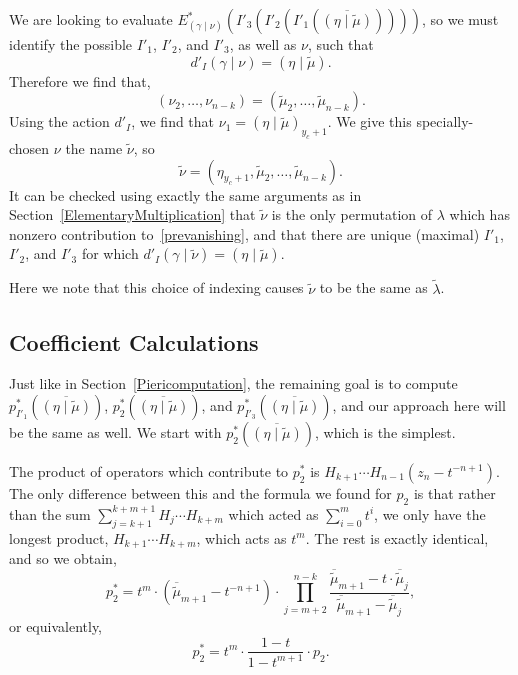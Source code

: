 \documentclass[ALCO]{cedram}
\newcommand{\Estar}[1]{E^*_{#1}}
\newcommand{\gammanu}{{(\gamma \mid \nu)}}
\newcommand{\mutilde}{{\widetilde{\mu}}}
\newcommand{\lambdatilde}{{\widetilde{\lambda}}}
\newcommand{\etamutilde}{{(\eta \mid \widetilde{\mu})}}
\newcommand{\dtwo}{d'_I}
\newcommand{\nutilde}{\widetilde{\nu}}
\newcommand{\gammanutilde}{{(\gamma \mid \nutilde)}}
\newcommand{\pstarone}{p^*_{I'_1}}
\newcommand{\pstartwo}{p^*_2}
\newcommand{\pstarthree}{p^*_{I'_3}}
\begin{document}
We are looking to evaluate $\Estar{\gammanu}\left(I'_3\left(I'_2\left(I'_1\left(\overline{\etamutilde}\right)\right)\right)\right)$, so we must identify the possible $I'_1$, $I'_2$, and $I'_3$, as well as $\nu$, such that
\[ \dtwo \gammanu =\etamutilde.\] Therefore we find that,
\[ (\nu_2, \dotsc, \nu_{n-k} )= (\mutilde_2,\dotsc, \mutilde_{n-k}).\]
Using the action $\dtwo$, we find that $\nu_1 = \etamutilde_{y_c+1}.$ We give this specially-chosen $\nu$ the name $\nutilde$, so
\[ \nutilde = (\eta_{y_c+1}, \mutilde_2, \dotsc, \mutilde_{n-k}).\]
It can be checked using exactly the same arguments as in Section~\ref{ElementaryMultiplication} that $\nutilde$ is the only permutation of $\lambda$ which has nonzero contribution to~\eqref{prevanishing}, and that there are unique (maximal) $I'_1$, $I'_2$, and $I'_3$ for which $\dtwo \gammanutilde = \etamutilde$.


Here we note that this choice of indexing causes $\nutilde$ to be the same as $\lambdatilde$.


\subsection{Coefficient Calculations}
Just like in Section~\ref{Piericomputation}, the remaining goal is to compute $\pstarone\left( \overline{\etamutilde}\right)$, $\pstartwo\left( \overline{\etamutilde}\right)$, and $\pstarthree\left( \overline{\etamutilde}\right)$, and our approach here will be the same as well. We start with $\pstartwo\left( \overline{\etamutilde}\right)$, which is the simplest.


The product of operators which contribute to $\pstartwo$ is $H_{k+1} \dotsm H_{n-1}(z_n-t^{-n+1})$. The only difference between this and the formula we found for $p_2$ is that rather than the sum $\displaystyle{\sum_{j={k+1}}^{k+m+1} H_j \dotsm H_{k+m}}$ which acted as $\displaystyle{\sum_{i=0}^m t^i}$, we only have the longest product, $H_{k+1} \dotsm H_{k+m}$, which acts as $t^m$. The rest is exactly identical, and so we obtain,
\[\pstartwo = t^m \cdot (\overline{\mutilde}_{m+1} - t^{-n+1}) \cdot \prod_{j=m+2}^{n-k} \frac{\overline{\mutilde}_{m+1} - t \cdot \overline{\mutilde}_j}{\overline{\mutilde}_{m+1} - \overline{\mutilde}_j} ,\]
or equivalently,
\[\pstartwo = t^m \cdot \frac{1-t}{1-t^{m+1}} \cdot p_2.\]
\end{document}
